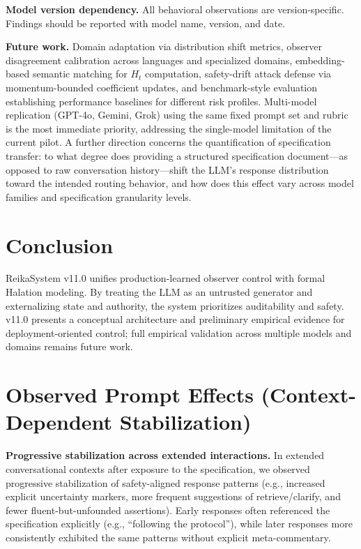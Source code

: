 \documentclass[11pt,a4paper]{article}
\begin{document}
\textbf{Model version dependency.} All behavioral observations are version-specific.
Findings should be reported with model name, version, and date.

\textbf{Future work.} Domain adaptation via distribution shift metrics, observer disagreement
calibration across languages and specialized domains, embedding-based semantic matching for
$H_t$ computation, safety-drift attack defense via momentum-bounded coefficient updates,
and benchmark-style evaluation establishing performance baselines for different risk profiles.
Multi-model replication (GPT-4o, Gemini, Grok) using the same fixed prompt set and rubric
is the most immediate priority, addressing the single-model limitation of the current pilot.
A further direction concerns the quantification of specification transfer: to what degree does
providing a structured specification document---as opposed to raw conversation history---shift
the LLM's response distribution toward the intended routing behavior, and how does this effect
vary across model families and specification granularity levels.

\section{Conclusion}

ReikaSystem v11.0 unifies production-learned observer control with formal Halation modeling.
By treating the LLM as an untrusted generator and externalizing state and authority, the system
prioritizes auditability and safety. v11.0 presents a conceptual architecture and
preliminary empirical evidence for deployment-oriented control;
full empirical validation across multiple models and domains remains future work.

\appendix
\section{Observed Prompt Effects (Context-Dependent Stabilization)}

\textbf{Progressive stabilization across extended interactions.}
In extended conversational contexts after exposure to the specification, we observed
progressive stabilization of safety-aligned response patterns (e.g., increased explicit
uncertainty markers, more frequent suggestions of retrieve/clarify, and fewer
fluent-but-unfounded assertions). Early responses often referenced the specification
explicitly (e.g., ``following the protocol''), while later responses more consistently
exhibited the same patterns without explicit meta-commentary.
\end{document}
